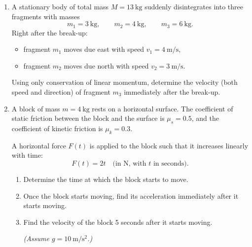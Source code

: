 \documentclass[12pt]{article}
\begin{document}
\begin{enumerate}
\begin{enumerate}
    \item Determine the force acting on the particle as a function of $x$.
    \item Find the positions of stable and unstable equilibrium.
    \item If the particle is released from rest at $x = 0$, determine its speed when it reaches $x = a$.
    \item Compute the work done by the force as the particle moves from $x = 0$ to $x = a$.
\end{enumerate}

   \item A stationary body of total mass $M = 13\ \text{kg}$ suddenly disintegrates into three fragments with masses
\[
m_1 = 3\ \text{kg}, \qquad m_2 = 4\ \text{kg}, \qquad m_3 = 6\ \text{kg}.
\]
Right after the break-up:
\begin{itemize}
    \item fragment $m_1$ moves due east with speed $v_1 = 4\ \text{m/s}$,
    \item fragment $m_2$ moves due north with speed $v_2 = 3\ \text{m/s}$.
\end{itemize}
Using only conservation of linear momentum, determine the velocity (both speed and direction) of fragment $m_3$ immediately after the break-up. 

\item A block of mass $m = 4~\mathrm{kg}$ rests on a horizontal surface. The coefficient of static friction between the block and the surface is $\mu_s = 0.5$, and the coefficient of kinetic friction is $\mu_k = 0.3$.

A horizontal force $F(t)$ is applied to the block such that it increases linearly with time:
\[
F(t) = 2t \quad \text{(in N, with $t$ in seconds)}.
\]

\begin{enumerate}
    \item Determine the time at which the block starts to move.
    \item Once the block starts moving, find its acceleration immediately after it starts moving.
    \item Find the velocity of the block 5 seconds after it starts moving. 

\textit{(Assume $g = 10~\mathrm{m/s^2}$.)}
\end{enumerate}

\end{enumerate}
\end{document}
